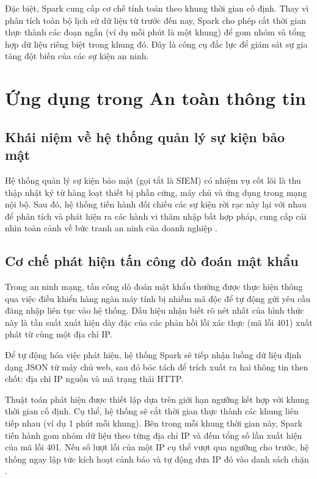 \documentclass[12pt,a4paper]{report}
\begin{document}
Đặc biệt, Spark cung cấp cơ chế tính toán theo khung thời gian cố định. Thay vì phân tích toàn bộ lịch sử dữ liệu từ trước đến nay, Spark cho phép cắt thời gian thực thành các đoạn ngắn (ví dụ mỗi phút là một khung) để gom nhóm và tổng hợp dữ liệu riêng biệt trong khung đó. Đây là công cụ đắc lực để giám sát sự gia tăng đột biến của các sự kiện an ninh.

\section{Ứng dụng trong An toàn thông tin}
\subsection{Khái niệm về hệ thống quản lý sự kiện bảo mật}
Hệ thống quản lý sự kiện bảo mật (gọi tắt là SIEM) có nhiệm vụ cốt lõi là thu thập nhật ký từ hàng loạt thiết bị phần cứng, máy chủ và ứng dụng trong mạng nội bộ. Sau đó, hệ thống tiến hành đối chiếu các sự kiện rời rạc này lại với nhau để phân tích và phát hiện ra các hành vi thâm nhập bất hợp pháp, cung cấp cái nhìn toàn cảnh về bức tranh an ninh của doanh nghiệp \cite{chapple2021}.

\subsection{Cơ chế phát hiện tấn công dò đoán mật khẩu}
Trong an ninh mạng, tấn công dò đoán mật khẩu thường được thực hiện thông qua việc điều khiển hàng ngàn máy tính bị nhiễm mã độc để tự động gửi yêu cầu đăng nhập liên tục vào hệ thống. Dấu hiệu nhận biết rõ nét nhất của hình thức này là tần suất xuất hiện dày đặc của các phản hồi lỗi xác thực (mã lỗi 401) xuất phát từ cùng một địa chỉ IP.

Để tự động hóa việc phát hiện, hệ thống Spark sẽ tiếp nhận luồng dữ liệu định dạng JSON từ máy chủ web, sau đó bóc tách để trích xuất ra hai thông tin then chốt: địa chỉ IP nguồn và mã trạng thái HTTP. 

Thuật toán phát hiện được thiết lập dựa trên giới hạn ngưỡng kết hợp với khung thời gian cố định. Cụ thể, hệ thống sẽ cắt thời gian thực thành các khung liên tiếp nhau (ví dụ 1 phút mỗi khung). Bên trong mỗi khung thời gian này, Spark tiến hành gom nhóm dữ liệu theo từng địa chỉ IP và đếm tổng số lần xuất hiện của mã lỗi 401. Nếu số lượt lỗi của một IP cụ thể vượt qua ngưỡng cho trước, hệ thống ngay lập tức kích hoạt cảnh báo và tự động đưa IP đó vào danh sách chặn \cite{anomaly_spark}.
\end{document}
